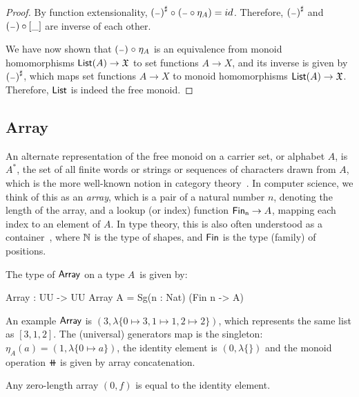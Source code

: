 \begin{proof}
    By function extensionality, ${({\scriptstyle{-}})}^{\sharp} \mathrel{\circ} ({\scriptstyle{-}} \circ \eta_A) = id$.
    Therefore, ${({\scriptstyle{-}})}^{\sharp}$ and $({\scriptstyle{-}}) \circ [\_]$ are inverse of each other.

    We have now shown that $({\scriptstyle{-}}) \mathrel{\circ} \eta_A$ is an equivalence from
    monoid homomorphisms $\operatorname{\mathsf{List}}(A) \to \mathfrak{X}$
    to set functions $A \to X$, and its inverse is given by ${({\scriptstyle{-}})}^{\sharp}$, which maps set
    functions $A \to X$ to monoid homomorphisms $\operatorname{\mathsf{List}}(A) \to \mathfrak{X}$. Therefore, $\operatorname{\mathsf{List}}$ is indeed
    the free monoid.
\end{proof}

\subsection{Array}\label{mon:array}

An alternate representation of the free monoid on a carrier set, or alphabet $A$, is $A^{\ast}$,
the set of all finite words or strings or sequences of characters drawn from $A$,
which is the more well-known notion in category theory~\cite{dubucFreeMonoids1974}.
%
In computer science, we think of this as an \emph{array},
which is a pair of a natural number $n$, denoting the length of the array,
and a lookup (or index) function $\Fin[n] \to A$, mapping each index to an element of $A$.
%
In type theory, this is also often understood as a container~\cite{abbottCategoriesContainers2003},
where $\mathbb{N}$ is the type of shapes, and $\Fin$ is the type (family) of positions.

\begin{definition}[Arrays]
    \label{def:arrays}
    The type of $\operatorname{\mathsf{Array}}$ on a type $A$~is given by:
    \begin{code}
Array : UU -> UU
Array A = Sg(n : Nat) (Fin n -> A)
    \end{code}
\end{definition}

An example $\operatorname{\mathsf{Array}}$ is $(3, \lambda\{ 0 \mapsto 3, 1 \mapsto 1, 2 \mapsto 2 \})$,
which represents the same list as $[3, 1, 2]$.
%
The (universal) generators map is the singleton: $\eta_A(a) = (1, \lambda\{ 0 \mapsto a \})$,
the identity element is $(0, \lambda\{\})$
and the monoid operation $\doubleplus$ is given by array concatenation.

\begin{lemma}\label{array:zero-is-id}
    Any zero-length array $(0, f)$ is equal to the identity element.
\end{lemma}

